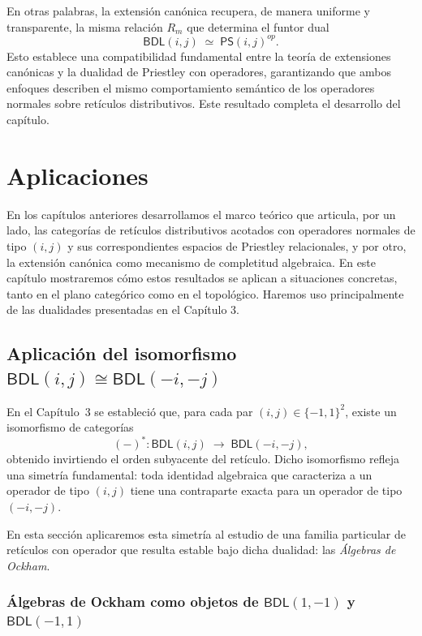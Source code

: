 \documentclass[12pt]{book}
\newcommand{\BDL}{\mathsf{BDL}}
\newcommand{\PS}{\mathsf{PS}}
\begin{document}
En otras palabras, la extensión canónica recupera, de manera uniforme y transparente,  
la misma relación $R_m$ que determina el funtor dual
\[
\BDL(i,j)\;\simeq\;\PS(i,j)^{op}.
\]
Esto establece una compatibilidad fundamental entre la teoría de
extensiones canónicas y la dualidad de Priestley con operadores,
garantizando que ambos enfoques describen el mismo comportamiento
semántico de los operadores normales sobre retículos distributivos. Este resultado completa el desarrollo del capítulo.






\chapter{Aplicaciones} \label{Ch 5}




En los capítulos anteriores desarrollamos el marco teórico que articula,
por un lado, las categorías de retículos distributivos acotados con
operadores normales de tipo $(i,j)$ y sus correspondientes
espacios de Priestley relacionales, y por otro, la extensión canónica
como mecanismo de completitud algebraica.
%
En este capítulo mostraremos cómo estos resultados se aplican a
situaciones concretas, tanto en el plano categórico como en el
topológico. Haremos uso principalmente de las dualidades presentadas en el Capítulo 3.


\section{Aplicación del isomorfismo
$\BDL(i,j)\cong\BDL(-i,-j)$}

En el Capítulo~3 se estableció que, para cada par 
\((i,j)\in\{-1,1\}^2\), existe un isomorfismo de categorías
\[
  (-)^*\colon \BDL(i,j)\;\longrightarrow\;\BDL(-i,-j),
\]
obtenido invirtiendo el orden subyacente del retículo.  
Dicho isomorfismo refleja una simetría fundamental: toda identidad algebraica que caracteriza a un operador de tipo \((i,j)\) tiene una contraparte exacta para un operador de tipo \((-i,-j)\).

En esta sección aplicaremos esta simetría al estudio de una familia particular de retículos con operador que resulta
estable bajo dicha dualidad: las \emph{Álgebras de Ockham}.


\subsection{Álgebras de Ockham como objetos de
$\BDL(1,-1)$ y $\BDL(-1,1)$}
\end{document}

